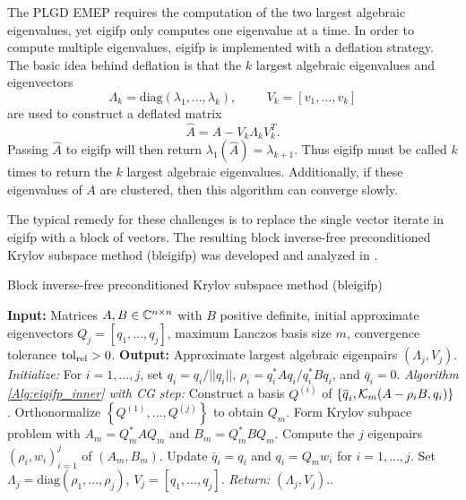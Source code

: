 \begin{enumerate}
The PLGD EMEP requires the computation of the two largest algebraic eigenvalues, yet eigifp only computes one eigenvalue at a time.  In order to compute multiple eigenvalues, eigifp is implemented with a deflation strategy.  The basic idea behind deflation is that the $k$ largest algebraic eigenvalues and eigenvectors
\begin{equation}
\Lambda_k = \text{diag}( \lambda_1, \ldots, \lambda_k), \hspace{1cm} V_k = [v_1, \ldots, v_k]
\end{equation}
are used to construct a deflated matrix
\begin{equation}
\widehat{A} = A - V_k \Lambda_k V_k^T.
\end{equation}
Passing $\widehat{A}$ to eigifp will then return $\lambda_1(\widehat{A}) = \lambda_{k+1}$.  Thus eigifp must be called $k$ times to return the $k$ largest algebraic eigenvalues.  Additionally, if these eigenvalues of $A$ are clustered, then this algorithm can converge slowly.  

The typical remedy for these challenges is to replace the single vector iterate in eigifp with a block of vectors.  The resulting block inverse-free preconditioned Krylov subspace method (bleigifp) was developed and analyzed in \cite{quillen2010block}.

\begin{algorithm}[H]
\caption{Block inverse-free preconditioned Krylov subspace method (bleigifp)}	\label{Alg:bleigifp}

\begin{algorithmic}[1]
	\Statex 	\textbf{Input:} Matrices $A, B \in {\mathbb C}^{n \times n}$ with $B$ positive definite, initial approximate eigenvectors $Q_j = [q_1, \ldots, q_j]$, maximum Lanczos basis size $m$,  convergence tolerance $\textnormal{tol}_\textnormal{rel} > 0$.
	\Statex 	\textbf{Output:} Approximate largest algebraic eigenpairs $(\Lambda_j, V_j)$.
	\State		\textit{Initialize:} For $i = 1, \ldots, j$, set $q_i = q_i/||q_i||$, $\rho_i = q_i^*A q_i / q_i^* B q_i$, and $\overline{q}_i = 0$.
			\State		\textit{Algorithm \ref{Alg:eigifp_inner} with CG step:} Construct a basis $Q^{(i)}$ of $\{\overline{q}_i, {\mathcal K}_m ( A-\rho_i B , q_i) \}$.
		\EndFor
		\State		Orthonormalize $\left\{ Q^{(1)}, \ldots, Q^{(j)} \right\}$ to obtain $Q_m$.
		\State		Form Krylov subpace problem with $A_m = Q_m^*AQ_m$ and $B_m = Q_m^*B Q_m$.
		\State		Compute the $j$ eigenpairs $(\rho_i, w_i)_{i=1}^j$ of $(A_m, B_m)$.
		\State		Update $\overline{q}_i = q_i$ and $q_i = Q_m w_i$ for $i = 1, \ldots, j$.
	\EndWhile
	\State		Set $\Lambda_j = \text{diag}(\rho_1, \ldots, \rho_j)$, $V_j = [q_1, \ldots, q_j]$.
	\State		\textit{Return:} $(\Lambda_j, V_j)$..
\end{algorithmic}


\end{algorithm}
\end{enumerate}

